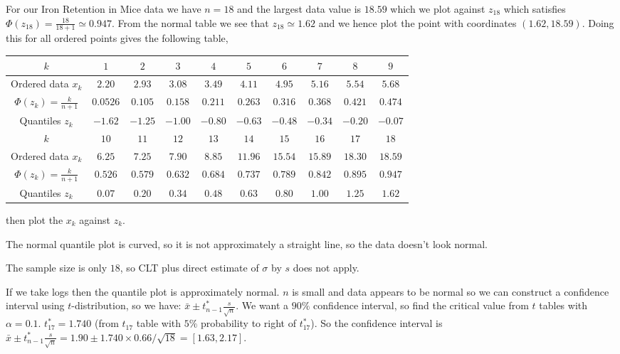 \documentclass[10pt, a4paper]{article}
\begin{document}
\begin{example}
\begin{solution}
        For our Iron Retention in Mice data we have $n = 18$ and the largest data value is $18.59$ which we plot against $z_{18}$ which satisfies $\Phi(z_{18}) = \frac{18}{18 + 1} \simeq 0.947$.
        From the normal table we see that $z_{18} \simeq 1.62$ and we hence plot the point with coordinates $(1.62, 18.59)$.
        Doing this for all ordered points gives the following table,
        \begin{table}[H]
            \begin{tabular}{|c|ccccccccc|}
                \hline
                $k$ & $1$ & $2$ & $3$ & $4$ & $5$ & $6$ & $7$ & $8$ & $9$ \\
                \hline
                 Ordered data $x_k$ & $2.20$ & $2.93$ & $3.08$ & $3.49$ & $4.11$ & $4.95$ & $5.16$ & $5.54$ & $5.68$ \\
                 $\Phi(z_k) = \frac{k}{n + 1}$ & $0.0526$ & $0.105$ & $0.158$ & $0.211$ & $0.263$ & $0.316$ & $0.368$ & $0.421$ & $0.474$ \\
                 Quantiles $z_k$ & $-1.62$ & $-1.25$ & $-1.00$ & $-0.80$ & $-0.63$ & $-0.48$ & $-0.34$ & $-0.20$ & $-0.07$ \\
                \hline
                $k$ & $10$ & $11$ & $12$ & $13$ & $14$ & $15$ & $16$ & $17$ & $18$ \\
                \hline
                 Ordered data $x_k$ &  $6.25$ & $7.25$ & $7.90$ & $8.85$ & $11.96$ & $15.54$ & $15.89$ & $18.30$ & $18.59$ \\
                 $\Phi(z_k) = \frac{k}{n + 1}$ & $0.526$ & $0.579$ & $0.632$ & $0.684$ & $0.737$ & $0.789$ & $0.842$ & $0.895$ & $0.947$ \\
                 Quantiles $z_k$ & $0.07$ & $0.20$ & $0.34$ & $0.48$ & $0.63$ & $0.80$ & $1.00$ & $1.25$ & $1.62$ \\
                 \hline
            \end{tabular}
        \end{table}
        then plot the $x_k$ against $z_k$.

        The normal quantile plot is curved,
        so it is not approximately a straight line,
        so the data doesn't look normal.

        The sample size is only $18$,
        so CLT plus direct estimate of $\sigma$ by $s$ does not apply.

        If we take logs then the quantile plot is approximately normal.
        $n$ is small and data appears to be normal so we can construct a confidence interval using $t$-distribution,
        so we have:
        $\bar{x} \pm t_{n - 1}^{*}\frac{s}{\sqrt{n}}$.
        We want a $90\%$ confidence interval,
        so find the critical value from $t$ tables with $\alpha = 0.1$.
        $t_{17}^{*} = 1.740$
        (from $t_{17}$ table with $5\%$ probability to right of $t_{17}^{*}$).
        So the confidence interval is $\bar{x} \pm t_{n - 1}^{*}\frac{s}{\sqrt{n}} = 1.90 \pm 1.740 \times 0.66 / \sqrt{18} = [1.63, 2.17]$.
    \end{solution}
\end{example}
\end{document}
